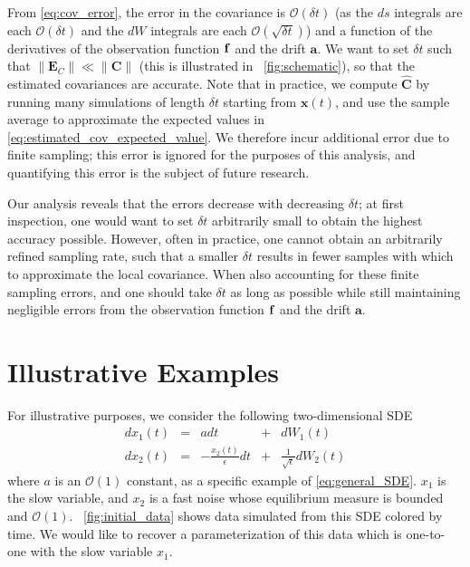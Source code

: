 %
From \eqref{eq:cov_error}, the error in the covariance is $\mathcal{O}(\delta t)$ (as the $ds$ integrals are each $\mathcal{O}(\delta t)$ and the $dW$ integrals are each $\mathcal{O}(\sqrt{\delta t})$) and a function of the derivatives of the observation function $\mathbf{f}$ and the drift $\mathbf{a}$.
%
We want to set $\delta t$ such that $\|\mathbf{E}_C \| \ll \| \mathbf{C} \|$
(this is illustrated in \fig~\ref{fig:schematic}), so that the estimated covariances are accurate.
%
Note that in practice, we compute $\widehat{\mathbf{C}}$ by running many simulations of length $\delta t$ starting from $\mathbf{x}(t)$, and use the sample average to approximate the expected values in \eqref{eq:estimated_cov_expected_value}.
%
We therefore incur additional error due to finite sampling; this error is ignored for the purposes of this analysis, and quantifying this error is the subject of future research.

Our analysis reveals that the errors decrease with decreasing $\delta t$; at first inspection, one would want to set $\delta t$ arbitrarily small to obtain the highest accuracy possible.
%
However, often in practice, one cannot obtain an arbitrarily refined sampling rate, such that a smaller $\delta t$ results in fewer samples with which to approximate the local covariance.%
When also accounting for these finite sampling errors, and one should take $\delta t$ as long as possible while still maintaining negligible errors from the observation function $\mathbf{f}$ and the drift $\mathbf{a}$.

\section{Illustrative Examples}

For illustrative purposes, we consider the following two-dimensional SDE
\begin{equation} \label{eq:specific_SDE}
\begin{aligned}
dx_1(t) &=& adt &+& dW_1(t)\\
dx_2(t) &=& -\frac{x_2(t)}{\epsilon} dt &+& \frac{1}{\sqrt{\epsilon}} dW_2(t)
\end{aligned}
\end{equation}
%
where $a$ is an $\mathcal{O}(1)$ constant, as a specific example of \eqref{eq:general_SDE}.
%
$x_1$ is the slow variable, and $x_2$ is a fast noise whose equilibrium measure is bounded and $\mathcal{O}(1)$.
%
\fig~\ref{fig:initial_data} shows data simulated from this SDE colored by time.
%
We would like to recover a parameterization of this data which is one-to-one with the slow variable $x_1$.

